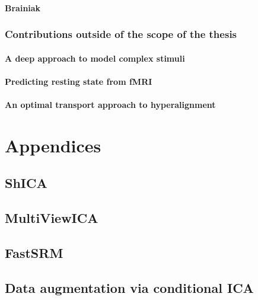 \documentclass[ twoside,openright,titlepage,numbers=noenddot,%
                headinclude,footinclude,cleardoublepage=empty,abstract=on,
                BCOR=5mm,paper=a4,fontsize=11pt, 
                ]{scrreprt}
\begin{document}
\subsection{Brainiak}
\section{Contributions outside of the scope of the thesis}
\subsection{A deep approach to model complex stimuli}
\subsection{Predicting resting state from fMRI}
\subsection{An optimal transport approach to hyperalignment}





\cleardoublepage

\appendix
\part{Appendices}
\chapter{ShICA}

\chapter{MultiViewICA}

\chapter{FastSRM}

\chapter{Data augmentation via conditional ICA}

\end{document}
